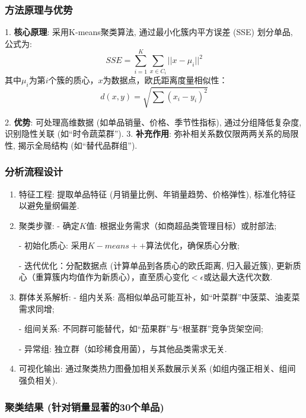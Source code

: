 \documentclass{MathNoteCN}
\begin{document}
\subsubsection{方法原理与优势}

1. \textbf{核心原理}: 采用K-means聚类算法, 通过最小化簇内平方误差 (SSE) 划分单品, 公式为: 
\begin{equation}
SSE=\sum_{i=1}^{K}\sum_{x∈C_i}||x-\mu_i||^2
\end{equation}  
其中$\mu_i$为第$i$个簇的质心，$x$为数据点，欧氏距离度量相似性：  
\begin{equation}
d(x,y)=\sqrt{\sum (x_i-y_i)^2}
\end{equation}

2. \textbf{优势}: 可处理高维数据 (如单品销量、价格、季节性指标), 通过分组降低复杂度, 识别隐性关联 (如“时令蔬菜群”). 
3. \textbf{补充作用}: 弥补相关系数仅限两两关系的局限性, 揭示全局结构 (如“替代品群组”). 

\subsubsection{分析流程设计}

\begin{enumerate}
    \item 特征工程: 提取单品特征 (月销量比例、年销量趋势、价格弹性), 标准化特征以避免量纲偏差. 
    \item 聚类步骤: 
    - 确定$K$值: 根据业务需求（如商超品类管理目标）或肘部法;

    - 初始化质心: 采用$K-means++$算法优化，确保质心分散; 

    - 迭代优化：分配数据点 (计算单品到各质心的欧氏距离, 归入最近簇), 更新质心（重算簇内均值作为新质心），直至质心变化$<\epsilon$或达最大迭代次数. 
    
    \item 群体关系解析: 
    - 组内关系: 高相似单品可能互补，如“叶菜群”中菠菜、油麦菜需求同增; 

    - 组间关系: 不同群可能替代，如“茄果群”与“根茎群”竞争货架空间; 

    - 异常组: 独立群（如珍稀食用菌），与其他品类需求无关. 
    \item 可视化输出: 通过聚类热力图叠加相关系数展示关系 (如组内强正相关、组间强负相关). 
\end{enumerate}

\subsubsection{聚类结果 (针对销量显著的30个单品)}
\end{document}
